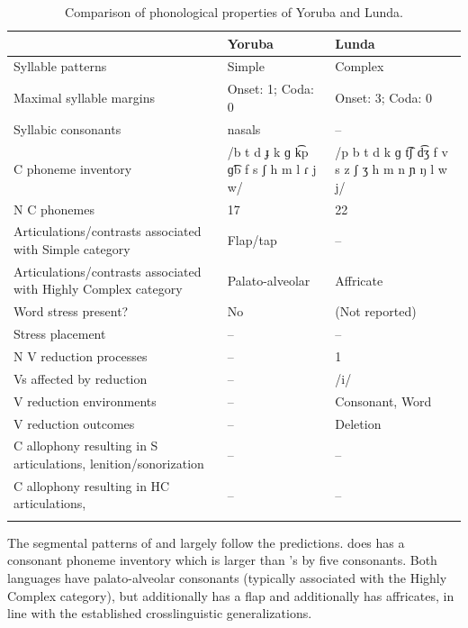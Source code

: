 \begin{table}
\begin{tabularx}{\textwidth}{Qp{3cm}p{3cm}}
\lsptoprule
 & {Yoruba} & {Lunda}\\
 \midrule 
 {Syllable patterns} & Simple & Complex\\
 \tablevspace
 {Maximal syllable margins} & Onset: 1; Coda: 0 & Onset: 3; Coda: 0\\
 \tablevspace
 {Syllabic consonants} & nasals & --\\
 \tablevspace
 {C phoneme inventory} & /b t d ɟ k ɡ k͡p ɡ͡b f s ʃ h m l ɾ j w/ & /p b t d k ɡ t͡ʃ d͡ʒ f v s z ʃ ʒ h m n ɲ ŋ l w j/\\
 \tablevspace
 {N C phonemes} & 17 & 22\\
 \tablevspace
 {Articulations/contrasts associated with {Simple}} {category} & {Flap/tap} & {--}\\
 \tablevspace
 {Articulations/contrasts associated with {Highly Complex}} {category} & {Palato-alveolar} & { {Affricate}}\\
 \tablevspace
 {Word stress present?} & {No} & {(Not reported)}\\
 \tablevspace
 {Stress placement} & {--} & {--}\\
 \tablevspace
 {N V reduction processes} & {--} & {1}\\
 \tablevspace
 {Vs affected by reduction}  & {--} & {/i/}\\
 \tablevspace
 {V reduction environments} & {--} & {Consonant, Word}\\
 \tablevspace
 {V reduction outcomes} & {--} & {Deletion}\\
 \tablevspace
 {C allophony resulting in S articulations, lenition/sonorization} & {--} & {--}\\
 \tablevspace
{ {C allophony resulting in HC articulations,} } & {--} & {--}\\
\lspbottomrule
\end{tabularx}
\caption{\label{tab:8.4}Comparison of phonological properties of Yoruba and Lunda.}
\end{table}

  The segmental patterns of  and  largely follow the predictions.  does has a consonant phoneme inventory which is larger than ’s by five consonants. Both languages have palato-alveolar consonants (typically associated with the Highly Complex category), but  additionally has a flap and  additionally has affricates, in line with the established crosslinguistic generalizations.

